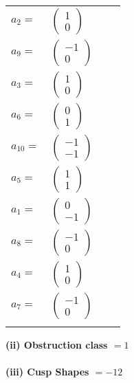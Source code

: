 \documentclass[1p]{elsarticle_modified}
\theoremstyle{definition}
\begin{document}
\begin{tabular}{m{7pt} m{180pt} m{7pt} m{180pt} }
\flushright $a_{2}=$&$\begin{pmatrix}1\\0\end{pmatrix}$ \\
\flushright $a_{9}=$&$\begin{pmatrix}-1\\0\end{pmatrix}$ \\
\flushright $a_{3}=$&$\begin{pmatrix}1\\0\end{pmatrix}$ \\
\flushright $a_{6}=$&$\begin{pmatrix}0\\1\end{pmatrix}$ \\
\flushright $a_{10}=$&$\begin{pmatrix}-1\\-1\end{pmatrix}$ \\
\flushright $a_{5}=$&$\begin{pmatrix}1\\1\end{pmatrix}$ \\
\flushright $a_{1}=$&$\begin{pmatrix}0\\-1\end{pmatrix}$ \\
\flushright $a_{8}=$&$\begin{pmatrix}-1\\0\end{pmatrix}$ \\
\flushright $a_{4}=$&$\begin{pmatrix}1\\0\end{pmatrix}$ \\
\flushright $a_{7}=$&$\begin{pmatrix}-1\\0\end{pmatrix}$\\&\end{tabular}
\flushleft \textbf{(ii) Obstruction class $= 1$}\\~\\
\flushleft \textbf{(iii) Cusp Shapes $= -12$}\\~\\
\end{document}
